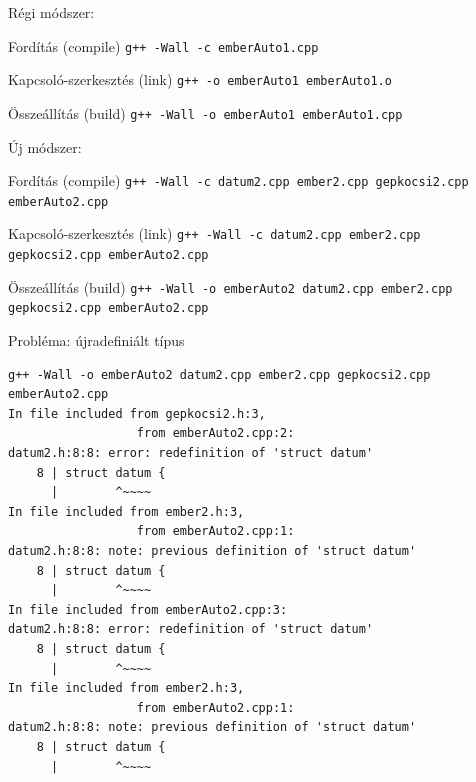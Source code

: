 \documentclass[usenames,dvipsnames,aspectratio=169]{beamer}
\begin{document}
\begin{frame}
  Régi módszer:\\
  \begin{alertblock}{Fordítás (compile)}
    \texttt{g++ -Wall -c emberAuto1.cpp}\\
  \end{alertblock}
  \begin{alertblock}{Kapcsoló-szerkesztés (link)}
    \texttt{g++ -o emberAuto1 emberAuto1.o}\\
  \end{alertblock}
  \vfill
  \begin{alertblock}{Összeállítás (build)}
    \texttt{g++ -Wall -o emberAuto1 emberAuto1.cpp}\\
  \end{alertblock}
\end{frame}

\begin{frame}
  Új módszer:\\
  \begin{exampleblock}{Fordítás (compile)}
    \texttt{g++ -Wall -c datum2.cpp ember2.cpp gepkocsi2.cpp emberAuto2.cpp}\\
  \end{exampleblock}
  \begin{exampleblock}{Kapcsoló-szerkesztés (link)}
    \texttt{g++ -Wall -c datum2.cpp ember2.cpp gepkocsi2.cpp emberAuto2.cpp}\\
  \end{exampleblock}
  \vfill
  \begin{exampleblock}{Összeállítás (build)}
    \footnotesize
    \texttt{g++ -Wall -o emberAuto2 datum2.cpp ember2.cpp gepkocsi2.cpp emberAuto2.cpp}\\
  \end{exampleblock}
\end{frame}

\begin{frame}[fragile]
  \begin{alertblock}{Probléma: újradefiniált típus}
    \vspace{-.2cm}
    \begin{verbatim}
g++ -Wall -o emberAuto2 datum2.cpp ember2.cpp gepkocsi2.cpp emberAuto2.cpp
In file included from gepkocsi2.h:3,
                  from emberAuto2.cpp:2:
datum2.h:8:8: error: redefinition of 'struct datum'
    8 | struct datum {
      |        ^~~~~
In file included from ember2.h:3,
                  from emberAuto2.cpp:1:
datum2.h:8:8: note: previous definition of 'struct datum'
    8 | struct datum {
      |        ^~~~~
In file included from emberAuto2.cpp:3:
datum2.h:8:8: error: redefinition of 'struct datum'
    8 | struct datum {
      |        ^~~~~
In file included from ember2.h:3,
                  from emberAuto2.cpp:1:
datum2.h:8:8: note: previous definition of 'struct datum'
    8 | struct datum {
      |        ^~~~~
\end{verbatim}
    \vspace{-.2cm}
  \end{alertblock}
\end{frame}
\end{document}
